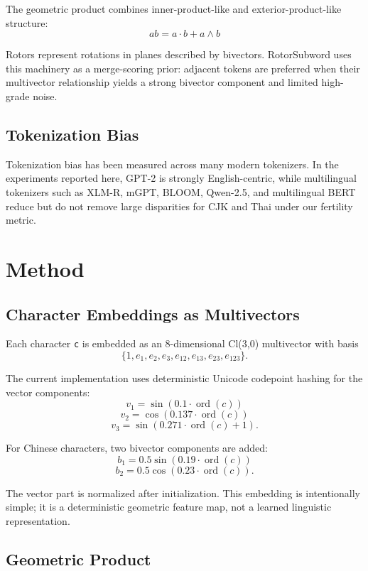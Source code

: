 \documentclass[11pt]{article}
\begin{document}
The geometric product combines inner-product-like and exterior-product-like structure:
\[
ab = a \cdot b + a \wedge b
\]

Rotors represent rotations in planes described by bivectors. RotorSubword uses this machinery as a merge-scoring prior: adjacent tokens are preferred when their multivector relationship yields a strong bivector component and limited high-grade noise.

\subsection{Tokenization Bias}

Tokenization bias has been measured across many modern tokenizers. In the experiments reported here, GPT-2 is strongly English-centric, while multilingual tokenizers such as XLM-R, mGPT, BLOOM, Qwen-2.5, and multilingual BERT reduce but do not remove large disparities for CJK and Thai under our fertility metric.

\section{Method}

\subsection{Character Embeddings as Multivectors}

Each character \texttt{c} is embedded as an 8-dimensional Cl(3,0) multivector with basis
\[
\{1, e_1, e_2, e_3, e_{12}, e_{13}, e_{23}, e_{123}\}.
\]

The current implementation uses deterministic Unicode codepoint hashing for the vector components:
\[
v_1 = \sin(0.1 \cdot \operatorname{ord}(c))
\]
\[
v_2 = \cos(0.137 \cdot \operatorname{ord}(c))
\]
\[
v_3 = \sin(0.271 \cdot \operatorname{ord}(c) + 1).
\]

For Chinese characters, two bivector components are added:
\[
b_1 = 0.5 \sin(0.19 \cdot \operatorname{ord}(c))
\]
\[
b_2 = 0.5 \cos(0.23 \cdot \operatorname{ord}(c)).
\]

The vector part is normalized after initialization. This embedding is intentionally simple; it is a deterministic geometric feature map, not a learned linguistic representation.

\subsection{Geometric Product}
\end{document}
